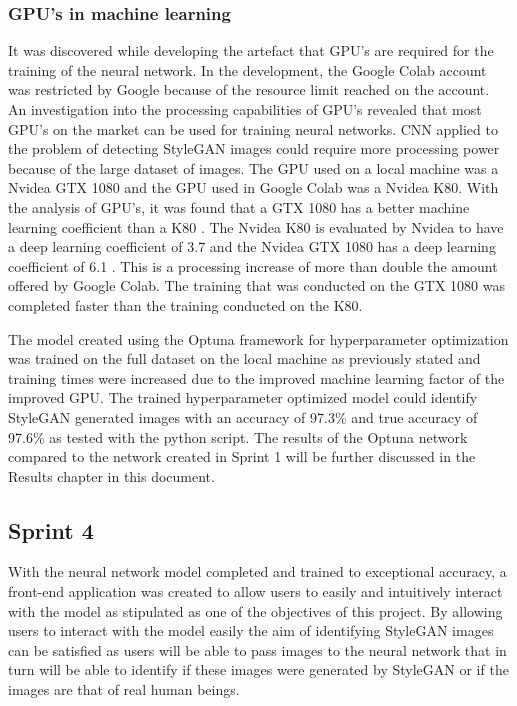 \subsubsection{GPU's in machine learning}

It was discovered while developing the artefact that GPU's are required for the training of the neural network. In the development, the Google Colab account was restricted by Google because of the resource limit reached on the account. An investigation into the processing capabilities of GPU's revealed that most GPU's on the market can be used for training neural networks. CNN applied to the problem of detecting StyleGAN images could require more processing power because of the large dataset of images. The GPU used on a local machine was a Nvidea GTX 1080 and the GPU used in Google Colab was a Nvidea K80. With the analysis of GPU's, it was found that a GTX 1080 has a better machine learning coefficient than a K80 \citep{cuda2021}. The Nvidea K80 is evaluated by Nvidea to have a deep learning coefficient of 3.7 and the Nvidea GTX 1080 has a deep learning coefficient of 6.1 \citep{cuda2021}. This is a processing increase of more than double the amount offered by Google Colab. The training that was conducted on the GTX 1080 was completed faster than the training conducted on the K80.

The model created using the Optuna framework for hyperparameter optimization was trained on the full dataset on the local machine as previously stated and training times were increased due to the improved machine learning factor of the improved GPU. The trained hyperparameter optimized model could identify StyleGAN generated images with an accuracy of 97.3\% and true accuracy of 97.6\% as tested with the python script. The results of the Optuna network compared to the network created in Sprint 1 will be further discussed in the Results chapter in this document.


\subsection{Sprint 4}

With the neural network model completed and trained to exceptional accuracy, a front-end application was created to allow users to easily and intuitively interact with the model as stipulated as one of the objectives of this project. By allowing users to interact with the model easily the aim of identifying StyleGAN images can be satisfied as users will be able to pass images to the neural network that in turn will be able to identify if these images were generated by StyleGAN or if the images are that of real human beings. 

